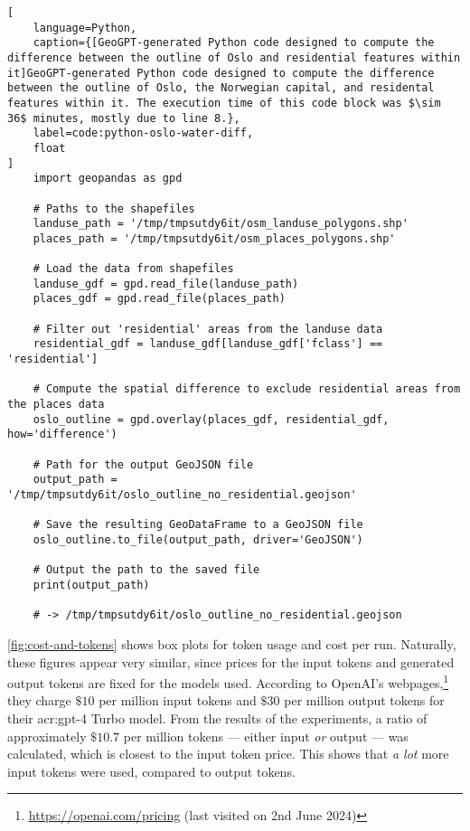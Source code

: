\FloatBarrier

\begin{lstlisting}[
    language=Python,
    caption={[GeoGPT-generated Python code designed to compute the difference between the outline of Oslo and residential features within it]GeoGPT-generated Python code designed to compute the difference between the outline of Oslo, the Norwegian capital, and residental features within it. The execution time of this code block was $\sim 36$ minutes, mostly due to line 8.},
    label=code:python-oslo-water-diff,
    float
]
    import geopandas as gpd

    # Paths to the shapefiles
    landuse_path = '/tmp/tmpsutdy6it/osm_landuse_polygons.shp'
    places_path = '/tmp/tmpsutdy6it/osm_places_polygons.shp'
    
    # Load the data from shapefiles
    landuse_gdf = gpd.read_file(landuse_path)
    places_gdf = gpd.read_file(places_path)
    
    # Filter out 'residential' areas from the landuse data
    residential_gdf = landuse_gdf[landuse_gdf['fclass'] == 'residential']
     
    # Compute the spatial difference to exclude residential areas from the places data
    oslo_outline = gpd.overlay(places_gdf, residential_gdf, how='difference')
    
    # Path for the output GeoJSON file
    output_path = '/tmp/tmpsutdy6it/oslo_outline_no_residential.geojson'
    
    # Save the resulting GeoDataFrame to a GeoJSON file
    oslo_outline.to_file(output_path, driver='GeoJSON')
    
    # Output the path to the saved file
    print(output_path)    

    # -> /tmp/tmpsutdy6it/oslo_outline_no_residential.geojson
\end{lstlisting}

\FloatBarrier

\autoref{fig:cost-and-tokens} shows box plots for token usage and cost per run. Naturally, these figures appear very similar, since prices for the input tokens and generated output tokens are fixed for the models used. According to OpenAI's webpages,\footnote{\url{https://openai.com/pricing} (last visited on 2nd June 2024)} they charge $\$10$ per million input tokens and $\$30$ per million output tokens for their \acrshort{acr:gpt}-4 Turbo model. From the results of the experiments, a ratio of approximately $\text{\$}10.7$ per million tokens --- either input \textit{or} output --- was calculated, which is closest to the input token price. This shows that \textit{a lot} more input tokens were used, compared to output tokens.


